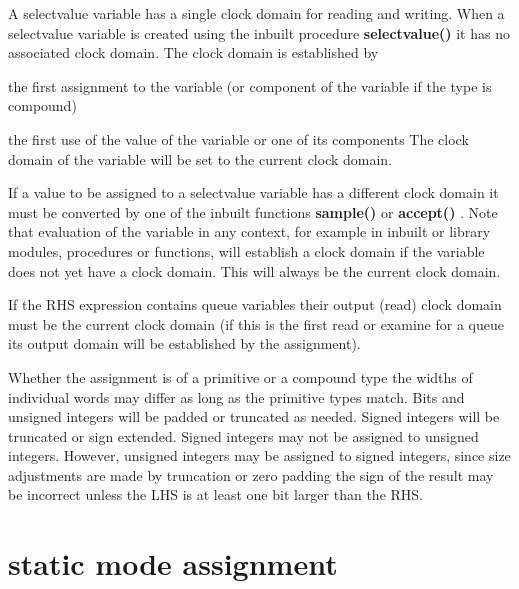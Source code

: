             A selectvalue variable has a single clock domain for reading and
            writing. When a selectvalue variable is created using the inbuilt
            procedure {\bf selectvalue()}  it has
            no associated clock domain. The clock domain is established by
            \blist
            \item   the first assignment to the variable (or component of
                    the variable if the type is compound)
            \item   the first use of the value
                    of the variable or one of its components
            \blend
            The clock domain of the variable will be set to the current clock
            domain.
            
            If a value to be assigned to a selectvalue variable has a different
            clock domain it must be converted by one of the inbuilt functions
            {\bf sample()}  or {\bf accept()}
            . Note that evaluation of the variable in
            any context, for example in inbuilt or library modules, procedures
            or functions, will establish a clock domain if the variable does not
            yet have a clock domain. This will always be the current clock
            domain.

            If the RHS expression contains queue variables their output (read)
            clock domain must be the current clock domain (if this is the first
            read or examine for a queue its output domain will be established by
            the assignment).

            Whether the assignment is of a primitive or a compound type the
            widths of individual words may differ as long as the primitive types
            match. Bits and unsigned integers will be padded or truncated as
            needed. Signed integers will be truncated or sign extended. Signed
            integers may not be assigned to unsigned integers. However, unsigned
            integers may be assigned to signed integers, since size adjustments
            are made by truncation or zero padding the sign of the result may be
            incorrect unless the LHS is at least one bit larger than the RHS.





    \section{static mode assignment}\label{sec:stat_ass}

